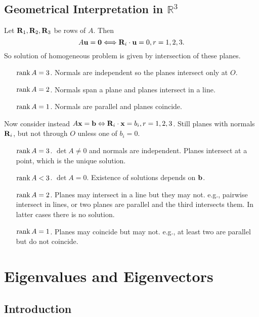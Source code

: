 \documentclass[10pt]{article}
\begin{document}
    \subsection{Geometrical Interpretation in $ \mathbb{R}^{3} $}
    Let $ {\bf R}_1,{\bf R}_2,{\bf R}_3 $ be rows of $A$. Then 
    \[
        A{\bf u}=\mathbf{0}\Longleftrightarrow {\bf R}_i\cdot {\bf u}=0, r=1,2,3
    .\]
    So solution of homogeneous problem is given by intersection of these planes.
    \begin{enumerate}[align=hang]
        \item[\underline{$ \rank A=3 $}.] Normals are independent so the planes intersect only at $O$.
        \item[\underline{$ \rank A=2 $}.] Normals span a plane and planes intersect in a line.
        \item[\underline{$ \rank A=1 $}.] Normals are parallel and planes coincide.
    \end{enumerate}

    Now consider instead $ A{\bf x}=\mathbf{b}\Leftrightarrow {\bf R}_i\cdot {\bf x}=b_i, r=1,2,3 $. Still planes with normals $ {\bf R}_i $, but not through $O$ unless one of $b_i=0$.
    \begin{enumerate}[align=hang]
        \item[\underline{$ \rank A=3 $}.] $ \det A\neq 0 $ and normals are independent. Planes intersect at a point, which is the unique solution.
        \item[\underline{$ \rank A<3 $}.] $ \det A=0 $. Existence of solutions depends on ${\bf b}$.
        \item[\underline{$ \rank A=2 $}.] Planes may intersect in a line but they may not. e.g., pairwise intersect in lines, or two planes are parallel and the third intersects them. In latter cases there is no solution.
        \item[\underline{$ \rank A=1 $}.] Planes may coincide but may not. e.g., at least two are parallel but do not coincide.
    \end{enumerate}
    \section{Eigenvalues and Eigenvectors}
    \subsection{Introduction}
\end{document}
